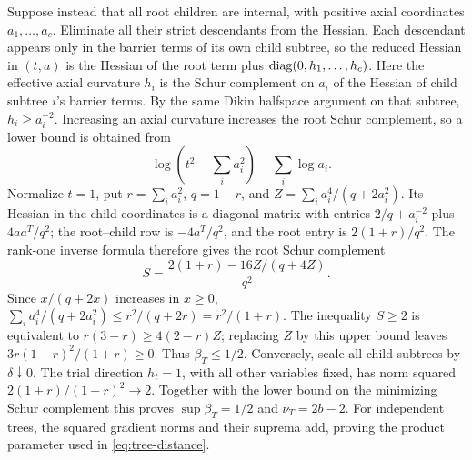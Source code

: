 Suppose instead that all root children are internal, with positive
axial coordinates $a_1,\ldots,a_c$. Eliminate all their strict
descendants from the Hessian. Each descendant appears only in the
barrier terms of its own child subtree, so the reduced Hessian in
$(t,a)$ is the Hessian of the root term plus $\operatorname{diag}(0,h_1,\ldots,h_c)$.
Here the effective axial curvature $h_i$ is the Schur complement on
$a_i$ of the Hessian of child subtree $i$'s barrier terms. By the same
Dikin halfspace argument on that subtree, $h_i\geq a_i^{-2}$.
Increasing an axial curvature increases the
root Schur complement, so a lower bound is obtained from
\[
 -\log(t^2-\textstyle\sum_i a_i^2)-\sum_i\log a_i.
\]
Normalize $t=1$, put $r=\sum_i a_i^2$, $q=1-r$, and
$Z=\sum_i a_i^4/(q+2a_i^2)$. Its Hessian in the child coordinates is a diagonal matrix with entries $2/q+a_i^{-2}$ plus
$4aa^T/q^2$; the root--child row is
$-4a^T/q^2$, and the root entry is $2(1+r)/q^2$.
The rank-one inverse formula therefore gives the root Schur complement
\begin{equation}
 S=\frac{2(1+r)-16Z/(q+4Z)}{q^2}.
 \label{eq:root-schur}
\end{equation}
Since $x/(q+2x)$ increases in $x\geq0$,
$\sum_i a_i^4/(q+2a_i^2)\leq r^2/(q+2r)=r^2/(1+r)$.
The inequality $S\geq2$ is equivalent to
$r(3-r)\geq4(2-r)Z$; replacing $Z$ by this upper bound leaves
$3r(1-r)^2/(1+r)\geq0$. Thus $\beta_T\leq1/2$.
Conversely, scale all child subtrees by $\delta\downarrow0$.
The trial direction $h_t=1$, with all other variables fixed, has norm
squared $2(1+r)/(1-r)^2\to2$.
Together with the lower bound on the minimizing Schur complement this
proves $\sup\beta_T=1/2$ and $\nu_T=2b-2$.
For independent trees, the squared gradient norms and their suprema
add, proving the product parameter used in
\eqref{eq:tree-distance}.

